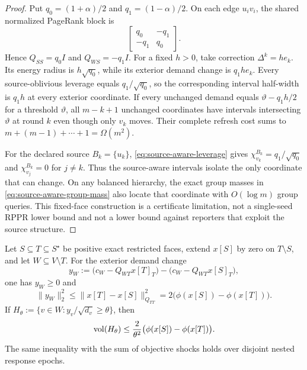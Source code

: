 \begin{proof}
Put $q_0=(1+\alpha)/2$ and $q_1=(1-\alpha)/2$.  On each edge
$u_i v_i$, the shared normalized PageRank block is
\begin{equation*}
 \begin{bmatrix}q_0&-q_1\\-q_1&q_0\end{bmatrix}.
\end{equation*}
Hence $Q_{SS}=q_0I$ and $Q_{WS}=-q_1I$.  For a fixed $h>0$, take correction
$\Delta^k=he_k$.  Its energy radius is $h\sqrt{q_0}$, while its exterior
demand change is $q_1he_k$.  Every source-oblivious leverage equals
$q_1/\sqrt{q_0}$, so the corresponding interval half-width is $q_1h$ at
every exterior coordinate.  If every unchanged demand equals
$\vartheta-q_1h/2$ for a threshold $\vartheta$, all $m-k+1$ unchanged
coordinates have intervals intersecting $\vartheta$ at round $k$ even though
only $v_k$ moves.  Their complete refresh cost sums to
$m+(m-1)+\cdots+1=\Omega(m^2)$.

For the declared source $B_k=\{u_k\}$,
\cref{eq:source-aware-leverage} gives
$\chi_{v_k}^{B_k}=q_1/\sqrt{q_0}$ and
$\chi_{v_j}^{B_k}=0$ for $j\neq k$.  Thus the source-aware intervals isolate
the only coordinate that can change.  On any balanced hierarchy, the exact
group masses in \cref{eq:source-aware-group-mass} also locate that coordinate
with $O(\log m)$ group queries.  This fixed-face construction is a
certificate limitation, not a single-seed RPPR lower bound and not a lower
bound against reporters that exploit the source structure.
\end{proof}

\begin{lemma}
\label{lem:response-energy-packing}
Let $S\subseteq T\subseteq S^\star$ be positive exact restricted faces,
extend $x[S]$ by zero on $T\setminus S$, and let $W\subseteq V\setminus T$.
For the exterior demand change
\begin{equation*}
 y_W:=\bigl(c_W-Q_{WT}x[T]_T\bigr)
      -\bigl(c_W-Q_{WT}x[S]_T\bigr),
\end{equation*}
one has $y_W\geq0$ and
\begin{equation}
 \|y_W\|_2^2
 \leq\|x[T]-x[S]\|_{Q_{TT}}^2
 =2\bigl(\phi(x[S])-\phi(x[T])\bigr).
 \label{eq:response-energy-packing}
\end{equation}
If $H_\theta:=\{v\in W:y_v/\sqrt{d_v}\geq\theta\}$, then
\begin{equation}
 \operatorname{vol}(H_\theta)
 \leq\frac{2}{\theta^2}
 \bigl(\phi(x[S])-\phi(x[T])\bigr).
 \label{eq:response-volume-packing}
\end{equation}
The same inequality with the sum of objective shocks holds over disjoint
nested response epochs.
\end{lemma}

